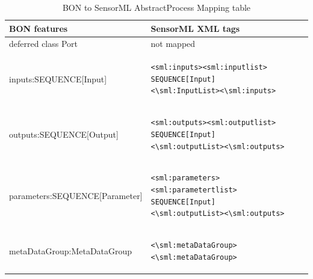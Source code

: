 \documentclass[]{final_report}
\begin{document}
\begin{table}[!th]
\centering
\begin{tabular}{|l|l|}
\hline
BON features & SensorML XML tags\\
\hline
   deferred class Port  & not mapped\\
\hline     
     inputs:SEQUENCE[Input] & \begin{lstlisting}
<sml:inputs><sml:inputlist>
SEQUENCE[Input]
<\sml:InputList><\sml:inputs>\end{lstlisting}\\

\hline 
     outputs:SEQUENCE[Output] & \begin{lstlisting}
<sml:outputs><sml:outputlist>
SEQUENCE[Input]
<\sml:outputList><\sml:outputs>\end{lstlisting}\\
\hline
     parameters:SEQUENCE[Parameter] & \begin{lstlisting}
<sml:parameters><sml:parametertlist>
SEQUENCE[Input]
<\sml:outputList><\sml:outputs>\end{lstlisting}\\

\hline                 
     metaDataGroup:MetaDataGroup &  \begin{lstlisting}
<\sml:metaDataGroup><\sml:metaDataGroup>\end{lstlisting}\\
 \hline    

\end{tabular}
\caption{BON to SensorML AbstractProcess Mapping table}\label{table:bon_sml_example}
\label{ex:table}
\end{table}
\end{document}
